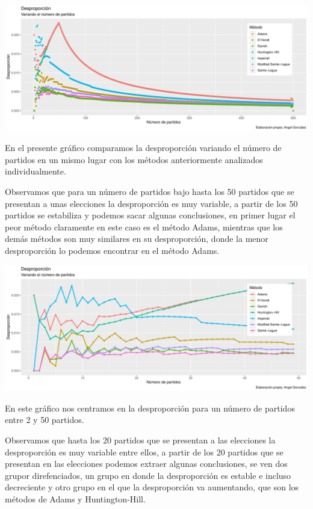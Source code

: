 \documentclass[12pt,a4paper,]{book}
\numberwithin{dummy}{section}
\theoremstyle{ocrenumbox}
\theoremstyle{blacknumex}
\theoremstyle{blacknumbox}
\theoremstyle{ocrenum}
\theoremstyle{ocrenum}
\begin{document}
\begin{center}\includegraphics[width=0.95\linewidth]{figurasR/unnamed-chunk-44-1} \end{center}

En el presente gráfico comparamos la desproporción variando el número de
partidos en un mismo lugar con los métodos anteriormente analizados
individualmente.

Observamos que para un número de partidos bajo hasta los 50 partidos que
se presentan a unas elecciones la desproporción es muy variable, a
partir de los 50 partidos se estabiliza y podemos sacar algunas
conclusiones, en primer lugar el peor método claramente en este caso es
el método Adams, mientras que los demás métodos son muy similares en su
desproporción, donde la menor desproporción lo podemos encontrar en el
método Adams.

\begin{center}\includegraphics[width=0.95\linewidth]{figurasR/unnamed-chunk-45-1} \end{center}

En este gráfico nos centramos en la desproporción para un número de
partidos entre 2 y 50 partidos.

Observamos que hasta los 20 partidos que se presentan a las elecciones
la desproporción es muy variable entre ellos, a partir de los 20
partidos que se presentan en las elecciones podemos extraer algunas
conclusiones, se ven dos grupor direfenciados, un grupo en donde la
desproporción es estable e incluso decreciente y otro grupo en el que la
desproporción va aumentando, que son los métodos de Adams y
Huntington-Hill.
\end{document}
